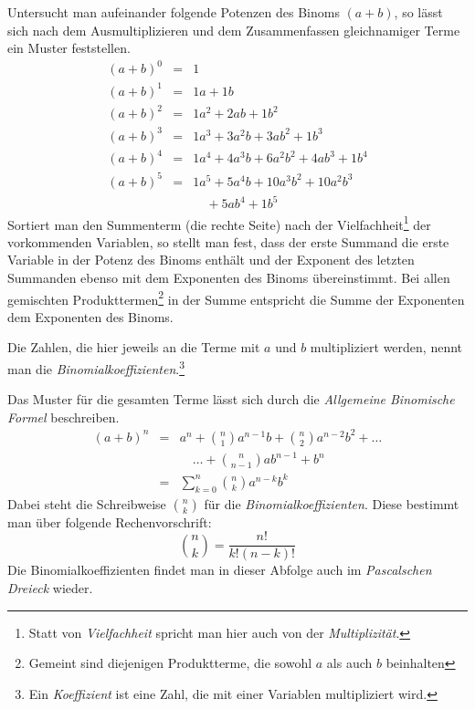 \begin{regel}
Untersucht man aufeinander folgende Potenzen des Binoms \((a+b)\), so lässt sich nach dem Ausmultiplizieren und dem Zusammenfassen gleichnamiger Terme ein Muster feststellen.
 \begin{eqnarray*}
  (a+b)^0 &=& 1 \\
  (a+b)^1 &=& 1a+1b \\
  (a+b)^2 &=& 1a^2 + 2ab + 1b^2\\
  (a+b)^3 &=& 1a^3 + 3a^2b + 3ab^2 + 1b^3\\
  (a+b)^4 &=& 1a^4 + 4a^3b + 6a^2b^2 + 4ab^3 + 1b^4\\
  (a+b)^5 &=& 1a^5 + 5a^4b + 10 a^3b^2 + 10a^2b^3\\
  && \quad + 5ab^4 + 1b^5
 \end{eqnarray*}
Sortiert man den Summenterm (die rechte Seite) nach der Vielfachheit\footnote{Statt von \emph{Vielfachheit} spricht man hier auch von der \emph{Multiplizität}.} der vorkommenden Variablen, so stellt man fest, dass der erste Summand die erste Variable in der Potenz des Binoms enthält und der Exponent des letzten Summanden ebenso mit dem Exponenten des Binoms übereinstimmt. Bei allen gemischten Produkttermen\footnote{Gemeint sind diejenigen Produktterme, die sowohl \(a\) als auch \(b\) beinhalten} in der Summe entspricht die Summe der Exponenten dem Exponenten des Binoms.
 
Die Zahlen, die hier jeweils an die Terme mit \(a\) und \(b\) multipliziert werden, nennt man die \emph{Binomialkoeffizienten}.\footnote{Ein \emph{Koeffizient} ist eine Zahl, die mit einer Variablen multipliziert wird.} 

Das Muster für die gesamten Terme lässt sich durch die \emph{Allgemeine Binomische Formel} beschreiben.
 \begin{eqnarray*}
  (a+b)^n &=& a^n + \binom{n}{1} a^{n-1}b + \binom{n}{2} a^{n-2}b^2 + \ldots\\&& \quad \ldots + \binom{n}{n-1} ab^{n-1} + b^n\\
  &=& \sum_{k=0}^n \binom{n}{k} a^{n-k}b^k
 \end{eqnarray*}
Dabei steht die Schreibweise \(\binom{n}{k}\) für die \emph{Binomialkoeffizienten}. Diese bestimmt man über folgende Rechenvorschrift:
\begin{equation*}
 \binom{n}{k} = \frac{n!}{k!(n-k)!}
\end{equation*}
Die Binomialkoeffizienten findet man in dieser Abfolge auch im \emph{Pascalschen Dreieck} wieder.
\end{regel}

